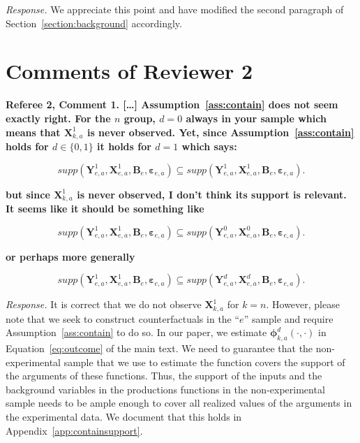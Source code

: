 \noindent \textit{Response.} We appreciate this point and have modified the second paragraph of Section~\ref{section:background} accordingly.

\section*{Comments of Reviewer 2}

\noindent \textbf{Referee 2, Comment 1. [\ldots] Assumption~\ref{ass:contain} does not seem exactly right. For the $n$ group, $d = 0$ always in your sample which means that $\bm{X}_{k,a}^1$ is never observed. Yet, since Assumption~\ref{ass:contain} holds for $d \in \{ 0,1 \}$ it holds for $d = 1$ which says:} 

\begin{equation}
supp( \bm{Y}_{e,a}^1, \bm{X}^1_{e,a}, \bm{B}_e, \bm{\varepsilon}_{e,a} ) \subseteq supp( \bm{Y}_{e,a}^1, \bm{X}^1_{e,a}, \bm{B}_e, \bm{\varepsilon}_{e,a} ). \label{eq:ref1}
\end{equation}

\textbf{but since $\bm{X}_{k,a}^1$ is never observed, I don't think its support is relevant. It seems like it should be something like} 

\begin{equation}
supp( \bm{Y}_{e,a}^1, \bm{X}^1_{e,a}, \bm{B}_e, \bm{\varepsilon}_{e,a} ) \subseteq supp( \bm{Y}_{e,a}^0, \bm{X}^0_{e,a}, \bm{B}_e, \bm{\varepsilon}_{e,a} ).  \label{eq:ref2}
\end{equation}

\textbf{or perhaps more generally}

\begin{equation}
supp( \bm{Y}_{e,a}^1, \bm{X}^1_{e,a}, \bm{B}_e, \bm{\varepsilon}_{e,a} ) \subseteq supp( \bm{Y}_{e,a}^d, \bm{X}^d_{e,a}, \bm{B}_e, \bm{\varepsilon}_{e,a} ).  \label{eq:ref3}
\end{equation}

\noindent \textit{Response.} It is correct that we do not observe $\bm{X}_{k,a}^1$ for $k = n$. However, please note that we seek to construct counterfactuals in the ``$e$'' sample and require Assumption~\ref{ass:contain} to do so. In our paper, we estimate $\bm{\phi}_{k,a}^d \left( \cdot, \cdot \right)$ in Equation~\eqref{eq:outcome} of the main text. We need to guarantee that the non-experimental sample that we use to estimate the function covers the support of the arguments of these functions. Thus, the support of the inputs and the background variables in the productions functions in the non-experimental sample needs to be ample enough to cover all realized values of the arguments in the experimental data. We document that this holds in Appendix~\ref{app:containsupport}. 


